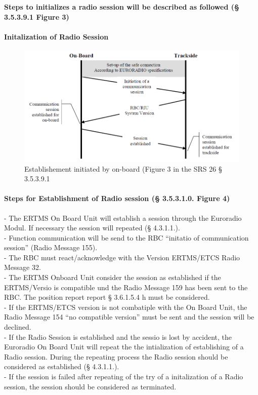 \documentclass{template/openetcs_report}
\begin{document}
\textbf{Steps to initializes a radio session will be described as followed (§ 3.5.3.9.1 Figure 3)}\\

\paragraph{Initalization of Radio Session}
\begin{figure}[hbtp]
\centering
\includegraphics [scale=0.5]{images/startingRBCsession}
\caption{Establishement initiated by on-board (Figure 3 in the SRS 26 § 3.5.3.9.1}
\end{figure}
\newpage


\paragraph{Steps for Establishment of Radio session (§ 3.5.3.1.0. Figure 4)}
- The ERTMS On Board Unit will establish a session through the Euroradio Modul. If necessary the session will repeated (§ 4.3.1.1.).\\
- Function communication will be send to the RBC ``initatio of communication session'' (Radio Message 155).\\
- The RBC must react/acknowledge with the Version ERTMS/ETCS {Radio Message 32}.\\
- The ERTMS Onboard Unit consider the session as established if the ERTMS/Versio is compatible und the Radio Message 159 has been sent to the RBC. The position report report § 3.6.1.5.4 h must be considered.\\
- If the ERTMS/ETCS version is not combatiple with the On Board Unit, the Radio Message 154 ``no compatible version'' must be sent and the session will be declined.\\
- If the Radio Session is established and the sessio is lost by accident, the Euroradio On Board Unit will repeat the the intialization of establishing of a Radio session. During the repeating process the Radio session should be considered as established (§ 4.3.1.1.).\\
-  If the session is failed after repeating of the try of a initalization of a Radio session, the session should be considered as terminated.\\
\end{document}

